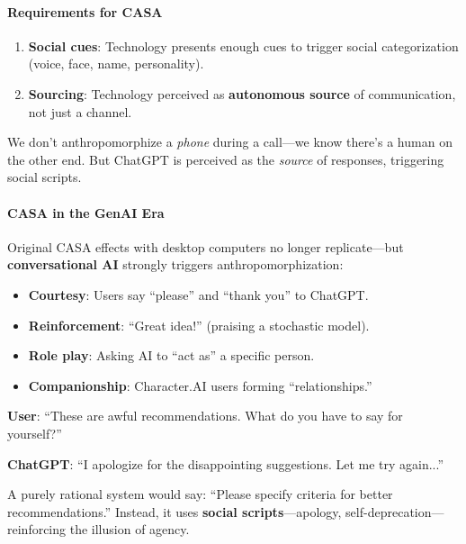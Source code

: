 \paragraph*{Requirements for CASA}
\begin{enumerate}
  \item \textbf{Social cues}: Technology presents enough cues to trigger social categorization (voice, face, name, personality).
  \item \textbf{Sourcing}: Technology perceived as \textbf{autonomous source} of communication, not just a channel.
\end{enumerate}

\begin{tipbox}
We don't anthropomorphize a \textit{phone} during a call---we know there's a human on the other end. But ChatGPT is perceived as the \textit{source} of responses, triggering social scripts.
\end{tipbox}

\paragraph*{CASA in the GenAI Era}
Original CASA effects with desktop computers no longer replicate---but \textbf{conversational AI} strongly triggers anthropomorphization:
\begin{itemize}
  \item \textbf{Courtesy}: Users say ``please'' and ``thank you'' to ChatGPT.
  \item \textbf{Reinforcement}: ``Great idea!'' (praising a stochastic model).
  \item \textbf{Role play}: Asking AI to ``act as'' a specific person.
  \item \textbf{Companionship}: Character.AI users forming ``relationships.''
\end{itemize}

\begin{exbox}
\textbf{User}: ``These are awful recommendations. What do you have to say for yourself?''

\textbf{ChatGPT}: ``I apologize for the disappointing suggestions. Let me try again...''

A purely rational system would say: ``Please specify criteria for better recommendations.'' Instead, it uses \textbf{social scripts}---apology, self-deprecation---reinforcing the illusion of agency.
\end{exbox}

